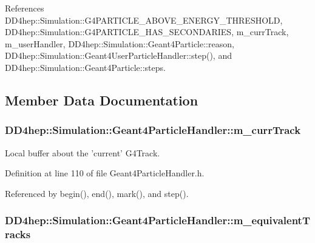 References DD4hep::Simulation::G4PARTICLE\_\-ABOVE\_\-ENERGY\_\-THRESHOLD, DD4hep::Simulation::G4PARTICLE\_\-HAS\_\-SECONDARIES, m\_\-currTrack, m\_\-userHandler, DD4hep::Simulation::Geant4Particle::reason, DD4hep::Simulation::Geant4UserParticleHandler::step(), and DD4hep::Simulation::Geant4Particle::steps.

\subsection{Member Data Documentation}
\hypertarget{class_d_d4hep_1_1_simulation_1_1_geant4_particle_handler_a4b3c0241a36842b2a6048a3e572e9c48}{
\subsubsection[{m\_\-currTrack}]{ {\bf DD4hep::Simulation::Geant4ParticleHandler::m\_\-currTrack}}}
\label{class_d_d4hep_1_1_simulation_1_1_geant4_particle_handler_a4b3c0241a36842b2a6048a3e572e9c48}


Local buffer about the 'current' G4Track. 

Definition at line 110 of file Geant4ParticleHandler.h.

Referenced by begin(), end(), mark(), and step().\hypertarget{class_d_d4hep_1_1_simulation_1_1_geant4_particle_handler_a5978fee684baca7e2e04931783440122}{
\subsubsection[{m\_\-equivalentTracks}]{ {\bf DD4hep::Simulation::Geant4ParticleHandler::m\_\-equivalentTracks}}}
\label{class_d_d4hep_1_1_simulation_1_1_geant4_particle_handler_a5978fee684baca7e2e04931783440122}


